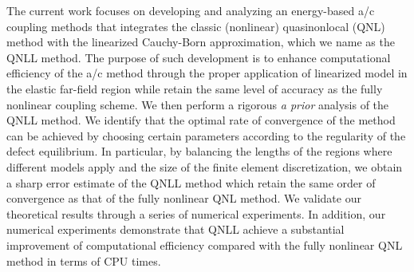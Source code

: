 %
%

The current work focuses on developing and analyzing an energy-based a/c coupling methods that integrates the classic (nonlinear) quasinonlocal (QNL) method \cite{2004_Shimokawa_QCM_ErrAna_PRB,2011_CO_1D_QNL_MATHCOMP,2012_XL_ML_Finite_Range_QNL_IMANUM} with the linearized Cauchy-Born approximation, which we name as the QNLL method. The purpose of such development is to enhance computational efficiency of the a/c method through the proper application of linearized model in the elastic far-field region while retain the same level of accuracy as the fully nonlinear coupling scheme. We then perform a rigorous {\it a prior} analysis of the QNLL method. We identify that the optimal rate of convergence of the method can be achieved by choosing certain parameters according to the regularity of the defect equilibrium. In particular, by balancing the lengths of the regions where different models apply and the size of the finite element discretization, we obtain a sharp error estimate of the QNLL method which retain the same order of convergence as that of the fully nonlinear QNL method. We validate our theoretical results through a series of numerical experiments. In addition, our numerical experiments demonstrate that QNLL achieve a substantial improvement of computational efficiency compared with the fully nonlinear QNL method in terms of CPU times.


%
%
%



